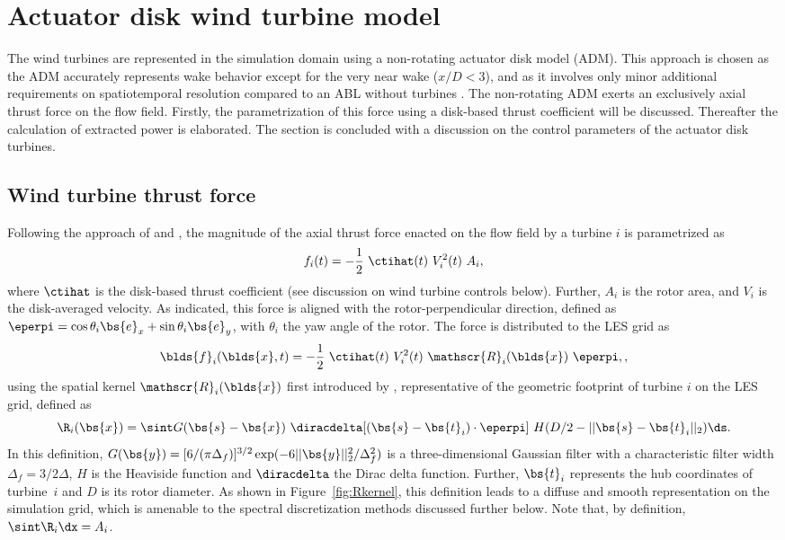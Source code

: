\section{Actuator disk wind turbine model}\label{sec:meth_adm}
The wind turbines are represented in the simulation domain using a non-rotating actuator disk model (ADM). This approach is chosen as the ADM accurately represents wake behavior except for the very near wake ($x/D < 3$), and as it involves only minor additional requirements on spatiotemporal resolution compared to an ABL without turbines \citep{mikkelsen2003actuator, wu2015modeling}. The non-rotating ADM exerts an exclusively axial thrust force on the flow field. Firstly, the parametrization of this force using a disk-based thrust coefficient will be discussed. Thereafter the calculation of extracted power is elaborated. The section is concluded with a discussion on the control parameters of the actuator disk turbines.

\subsection{Wind turbine thrust force}
Following the approach of \cite{meyers2010large} and \cite{calaf2010large}, the magnitude of the axial thrust force enacted on the flow field by a turbine $i$ is parametrized as 
\begin{equation}
f_i(t) = - \frac{1}{2}~\ctihat(t)~V_{i}^2(t)~A_i,
\end{equation}
where $\ctihat$ is the disk-based thrust coefficient (see discussion on wind turbine controls below). Further, $A_i$ is the rotor area, and $V_i$ is the disk-averaged velocity. As indicated, this force is aligned with the rotor-perpendicular direction, defined as $\eperpi =  \cos \theta_i \bs{e}_x + \sin \theta_i \bs{e}_y $, with $\theta_i$ the yaw angle of the rotor. The force is distributed to the LES grid as 
\begin{equation}
\blds{f}_i(\blds{x},t) = - \frac{1}{2}~\ctihat(t)~V_{i}^2(t)~\mathscr{R}_i(\blds{x})~\eperpi,\label{eq:define_force}, 
\end{equation}
using the spatial kernel $\mathscr{R}_i (\blds{x})$ first introduced by \cite{meyers2010large}, representative of the geometric footprint of turbine $i$ on the LES grid, defined as 
\begin{equation}
\R_i(\bs{x}) = \sint G(\bs{s}-\bs{x}) ~ \diracdelta [(\bs{s}-\bs{t}_i)\cdot\eperpi] ~ H(D/2-\vert\vert \bs{s}-\bs{t}_i\vert\vert_2) \ds \label{eq:R}.
\end{equation} 
In this definition, $G(\bs{y}) = [6/(\pi \Delta_f)]^{3/2} \exp(-6\vert\vert \bs{y}\vert\vert_2^2/\Delta_f^2)$ is a three-dimensional Gaussian filter with a characteristic filter width $\Delta_f = 3/2\Delta$, $H$ is the Heaviside function and $\diracdelta$ the Dirac delta function. Further, $\bs{t}_i$ represents the hub coordinates of turbine~$i$ and $D$ is its rotor diameter. As shown in Figure~\ref{fig:Rkernel}, this definition leads to a diffuse and smooth representation on the simulation grid, which is amenable to the spectral discretization methods discussed further below. Note that, by definition, $\sint \R_i \dx = A_i$.

